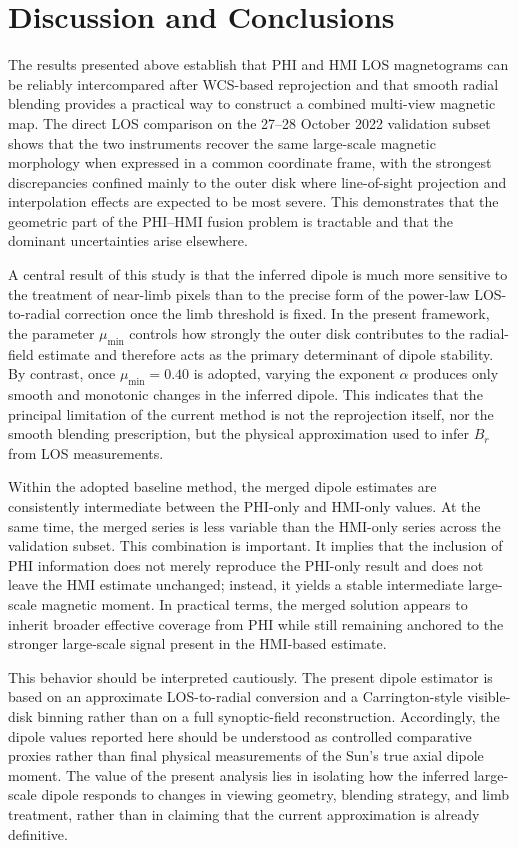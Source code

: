 \documentclass[namedreferences,hyperref,optionalrh]{spr-sola}
\begin{document}
\section{Discussion and Conclusions}
\label{sec:discussion}

The results presented above establish that PHI and HMI LOS magnetograms can be reliably intercompared after WCS-based reprojection and that smooth radial blending provides a practical way to construct a combined multi-view magnetic map. The direct LOS comparison on the 27--28 October 2022 validation subset shows that the two instruments recover the same large-scale magnetic morphology when expressed in a common coordinate frame, with the strongest discrepancies confined mainly to the outer disk where line-of-sight projection and interpolation effects are expected to be most severe. This demonstrates that the geometric part of the PHI--HMI fusion problem is tractable and that the dominant uncertainties arise elsewhere.

A central result of this study is that the inferred dipole is much more sensitive to the treatment of near-limb pixels than to the precise form of the power-law LOS-to-radial correction once the limb threshold is fixed. In the present framework, the parameter $\mu_{\min}$ controls how strongly the outer disk contributes to the radial-field estimate and therefore acts as the primary determinant of dipole stability. By contrast, once $\mu_{\min}=0.40$ is adopted, varying the exponent $\alpha$ produces only smooth and monotonic changes in the inferred dipole. This indicates that the principal limitation of the current method is not the reprojection itself, nor the smooth blending prescription, but the physical approximation used to infer $B_r$ from LOS measurements.

Within the adopted baseline method, the merged dipole estimates are consistently intermediate between the PHI-only and HMI-only values. At the same time, the merged series is less variable than the HMI-only series across the validation subset. This combination is important. It implies that the inclusion of PHI information does not merely reproduce the PHI-only result and does not leave the HMI estimate unchanged; instead, it yields a stable intermediate large-scale magnetic moment. In practical terms, the merged solution appears to inherit broader effective coverage from PHI while still remaining anchored to the stronger large-scale signal present in the HMI-based estimate.

This behavior should be interpreted cautiously. The present dipole estimator is based on an approximate LOS-to-radial conversion and a Carrington-style visible-disk binning rather than on a full synoptic-field reconstruction. Accordingly, the dipole values reported here should be understood as controlled comparative proxies rather than final physical measurements of the Sun's true axial dipole moment. The value of the present analysis lies in isolating how the inferred large-scale dipole responds to changes in viewing geometry, blending strategy, and limb treatment, rather than in claiming that the current approximation is already definitive.
\end{document}
